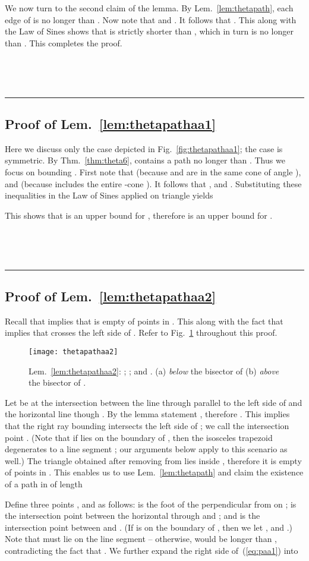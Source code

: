\documentclass[11pt]{article}
\newcommand{\qed}{\rule{0.5em}{1.5ex}}
\newcommand{\fqed}{{\hfill~\qed}}
\newcommand{\eproof}{{\hfill~\fqed} \vspace{1em}}
\begin{document}
We now turn to the second claim of the lemma. By Lem.~\ref{lem:thetapath}, each edge of  is no longer than . Now note that  and . It follows that . This along with the Law of Sines  shows that  is strictly shorter than , which in turn is no longer than . This completes the proof.
\eproof

\subsection{Proof of Lem.~\ref{lem:thetapathaa1}}
Here we discuss only the case  depicted in Fig.~\ref{fig:thetapathaa1}; the case  is symmetric.
By Thm.~\ref{thm:theta6},  contains a path  no longer than . Thus we focus on bounding .
First note that  (because  and  are in the same cone of angle ), and  (because  includes the entire -cone ).
It follows that
, and . Substituting these inequalities in the Law of Sines applied on triangle  yields

This shows that  is an upper bound for , therefore  is an upper bound for .
\eproof


\subsection{Proof of Lem.~\ref{lem:thetapathaa2}}
Recall that  implies that  is empty of points in . This along with the fact that  implies that  crosses the left side of . Refer to Fig.~\ref{fig:thetapathaa2} throughout this proof.
\begin{figure}[htpb]
\centering
\texttt{[image: thetapathaa2]}
\caption{Lem.~\ref{lem:thetapathaa2}: ; ; and . (a)  \emph{below} the bisector of  (b)  \emph{above} the bisector of .}
\label{fig:thetapathaa2}
\end{figure}
Let  be at the intersection between the line through  parallel to the left side of  and the horizontal line though . By the lemma statement , therefore . This implies that the right ray bounding  intersects the left side of ; we call the intersection point .
(Note that if  lies on the boundary of , then the isosceles trapezoid  degenerates to a line segment ; our arguments below apply to this scenario as well.)
The triangle obtained after removing  from  lies inside , therefore it is empty of points in . This enables us to use
Lem.~\ref{lem:thetapath} and claim the existence of a path  in  of length

Define three points ,  and  as follows:  is the foot of the perpendicular from  on ;  is the intersection point between the horizontal through  and ; and  is the intersection point between  and . (If  is on the boundary of , then we let ,  and .) Note that  must lie on the line segment  -- otherwise,  would be longer than , contradicting the fact that . We further expand the right side of~(\ref{eq:paa1}) into
\end{document}
